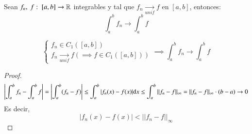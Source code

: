 \begin{pro}
    Sean $f_n,\ f :\ [a, b] \to \mathbb{R}$ integrables y tal que $f_n\xrightarrow[unif]{}f$ en $[a, b]$, entonces:
    $$
        \int_a^b f_n \to \int_a^b f
    $$
\end{pro}
\begin{cor}
    $$
        \begin{cases}
            f_n \in C_1([a,b])\\
            f_n \xrightarrow[unif]{} f (\implies f\in C_1([a, b]))
        \end{cases} \implies \int_a^b f_n \to \int_a^b f
    $$
\end{cor}
\begin{proof}
    $$
        \left|\int_a^b f_n - \int_a^b f \right| = \left|\int_a^b (f_n-f) \right|  \leq \int_a^b |f_n(x) - f(x)| \mathrm{d} x \leq \int_a^b ||f_ n - f||_\infty = ||f_n - f||_\infty \cdot (b - a) \to 0
    $$
    Es decir, $$|f_n(x) - f(x)| < ||f_n - f||_\infty$$
\end{proof}

